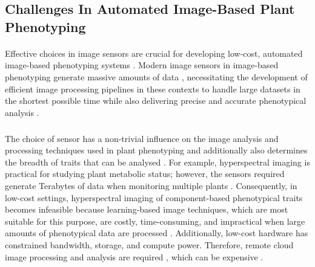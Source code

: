 \subsection{Challenges  In Automated Image-Based Plant Phenotyping}
\paragraph{}
Effective choices in image sensors are crucial for developing low-cost, automated image-based phenotyping systems \cite{zhangHighthroughputPhenotypingPlant2023}.
Modern image sensors in image-based phenotyping generate massive amounts of data \cite{gomesComputationalSustainabilityComputational2009}, necessitating the development of efficient image processing pipelines in these contexts to handle large datasets in the shortest possible time while also delivering precise and accurate phenotypical analysis \cite{minerviniImageAnalysisNew2015}. 

\subparagraph{}
The choice of sensor has a non-trivial influence on the image analysis and processing techniques used in plant phenotyping and additionally also determines the breadth of traits that can be analysed \cite{liReviewImagingTechniques2014}. For example, hyperspectral imaging is practical for studying plant metabolic status; however, the sensors required generate Terabytes of data when monitoring multiple plants \cite{bauckhageDataMiningPattern2013}. Consequently, in low-cost settings, hyperspectral imaging of component-based phenotypical traits becomes infeasible because learning-based image techniques, which are most suitable for this purpose, are costly, time-consuming, and impractical when large amounts of phenotypical data are processed \cite{bauckhageDataMiningPattern2013}. Additionally, low-cost hardware has constrained bandwidth, storage, and compute power. Therefore, remote cloud image processing and analysis are required \cite{debaucheCloudArchitecturePlant2020}, which can be expensive \cite{minerviniImageAnalysisNew2015}.

